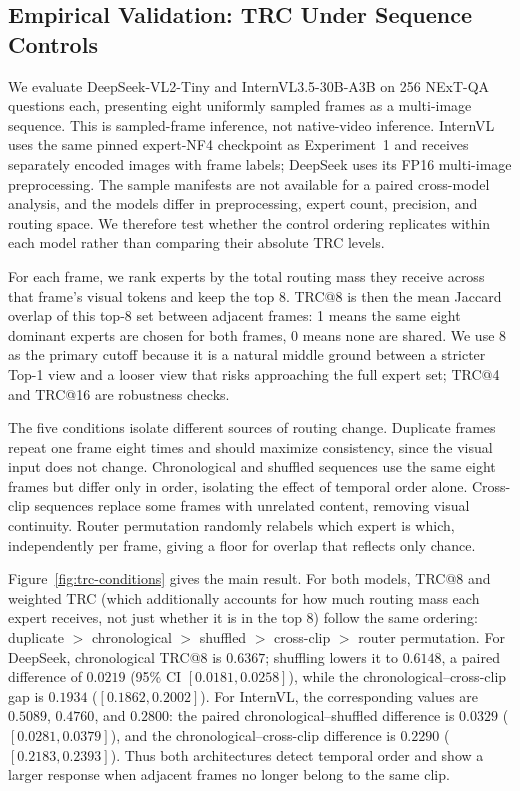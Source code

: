 \documentclass[10pt]{article}
\newenvironment{reviewchange}{\begingroup\color{red}}{\endgroup}
\begin{document}
\begin{reviewchange}
\begin{reviewchange}
\subsection{Empirical Validation: TRC Under Sequence Controls}
\label{sec:trc-empirical}

We evaluate DeepSeek-VL2-Tiny and InternVL3.5-30B-A3B on 256 NExT-QA questions each,
presenting eight uniformly sampled frames as a multi-image sequence.  This is
sampled-frame inference, not native-video inference.  InternVL uses the same pinned
expert-NF4 checkpoint as Experiment~1 and receives separately encoded images with frame
labels; DeepSeek uses its FP16 multi-image preprocessing.  The sample manifests are not
available for a paired cross-model analysis, and the models differ in preprocessing,
expert count, precision, and routing space.  We therefore test whether the control
ordering replicates within each model rather than comparing their absolute TRC levels.

For each frame, we rank experts by the total routing mass they receive across that
frame's visual tokens and keep the top 8.  TRC@8 is then the mean Jaccard overlap of
this top-8 set between adjacent frames: 1 means the same eight dominant experts are
chosen for both frames, 0 means none are shared.  We use 8 as the primary cutoff because
it is a natural middle ground between a stricter Top-1 view and a looser view that risks
approaching the full expert set; TRC@4 and TRC@16 are robustness checks.

The five conditions isolate different sources of routing change.  Duplicate frames
repeat one frame eight times and should maximize consistency, since the visual input
does not change.  Chronological and shuffled sequences use the same eight frames but
differ only in order, isolating the effect of temporal order alone.  Cross-clip
sequences replace some frames with unrelated content, removing visual continuity.
Router permutation randomly relabels which expert is which, independently per frame,
giving a floor for overlap that reflects only chance.

Figure~\ref{fig:trc-conditions} gives the main result.  For both models, TRC@8 and
weighted TRC (which additionally accounts for how much routing mass each expert
receives, not just whether it is in the top 8) follow the same ordering: duplicate
$>$ chronological $>$ shuffled $>$ cross-clip $>$ router permutation.  For DeepSeek,
chronological TRC@8 is $0.6367$; shuffling lowers it to $0.6148$, a paired difference
of $0.0219$ (95\% CI $[0.0181,0.0258]$), while the chronological--cross-clip gap is
$0.1934$ ($[0.1862,0.2002]$).  For InternVL, the corresponding values are $0.5089$,
$0.4760$, and $0.2800$: the paired chronological--shuffled difference is $0.0329$
($[0.0281,0.0379]$), and the chronological--cross-clip difference is $0.2290$
($[0.2183,0.2393]$).  Thus both architectures detect temporal order and show a larger
response when adjacent frames no longer belong to the same clip.


\end{reviewchange}
\end{reviewchange}
\end{document}
